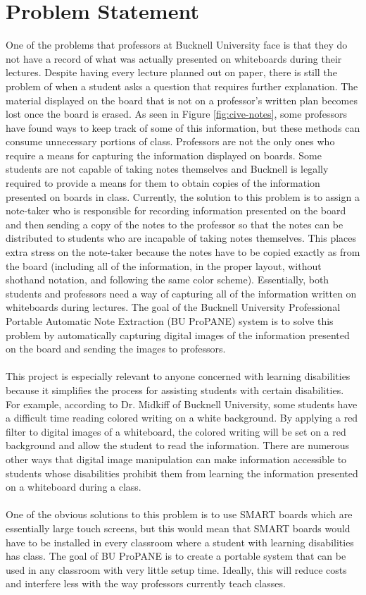 \documentclass{article}
\begin{document}
	\section{Problem Statement}
		One of the problems that professors at Bucknell University face is that they do not have a record of what was actually presented on whiteboards during their lectures. Despite having every lecture planned out on paper, there is still the problem of when a student asks a question that requires further explanation. The material displayed on the board that is not on a professor's written plan becomes lost once the board is erased. As seen in Figure \ref{fig:cive-notes}, some professors have found ways to keep track of some of this information, but these methods can consume unnecessary portions of class. Professors are not the only ones who require a means for capturing the information displayed on boards. Some students are not capable of taking notes themselves and Bucknell is legally required to provide a means for them to obtain copies of the information presented on boards in class. Currently, the solution to this problem is to assign a note-taker who is responsible for recording information presented on the board and then sending a copy of the notes to the professor so that the notes can be distributed to students who are incapable of taking notes themselves. This places extra stress on the note-taker because the notes have to be copied exactly as from the board (including all of the information, in the proper layout, without shothand notation, and following the same color scheme). Essentially, both students and professors need a way of capturing all of the information written on whiteboards during lectures. The goal of the Bucknell University Professional Portable Automatic Note Extraction (BU ProPANE) system is to solve this problem by automatically capturing digital images of the information presented on the board and sending the images to professors.\\
		\\
		This project is especially relevant to anyone concerned with learning disabilities because it simplifies the process for assisting students with certain disabilities. For example, according to Dr. Midkiff of Bucknell University, some students have a difficult time reading colored writing on a white background. By applying a red filter to digital images of a whiteboard, the colored writing will be set on a red background and allow the student to read the information. There are numerous other ways that digital image manipulation can make information accessible to students whose disabilities prohibit them from learning the information presented on a whiteboard during a class.\\
		\\
		One of the obvious solutions to this problem is to use SMART boards which are essentially large touch screens, but this would mean that SMART boards would have to be installed in every classroom where a student with learning disabilities has class. The goal of BU ProPANE is to create a portable system that can be used in any classroom with very little setup time. Ideally, this will reduce costs and interfere less with the way professors currently teach classes. 
		
\end{document}
